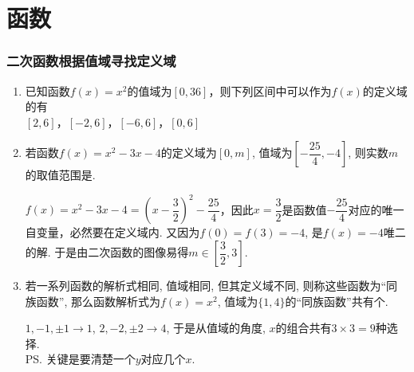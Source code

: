 \chapter*{函数}
\subsection*{二次函数根据值域寻找定义域}
\begin{enumerate}
    \item 已知函数$f(x) = x^2$的值域为$[0, 36]$，则下列区间中可以作为$f(x)$的定义域的有 \\
    $[2, 6]$，$[-2, 6]$，$[-6, 6]$，$[0, 6]$
    \item 若函数$f(x)=x^2-3x-4$的定义域为$[0,m]$, 值域为$\left[-\dfrac{25}{4},-4\right]$, 则实数$m$的取值范围是. 
    \begin{jieda}
    $f(x)=x^2-3x-4=(x-\dfrac{3}{2})^2-\dfrac{25}{4}$，因此$x = \dfrac{3}{2}$是函数值$-\dfrac{25}{4}$对应的唯一自变量，必然要在定义域内. 又因为$f(0)=f(3)=-4$, 是$f(x)=-4$唯二的解. 于是由二次函数的图像易得$m\in\left[\dfrac{3}{2},3\right]$. 
    \end{jieda}
    \item 若一系列函数的解析式相同, 值域相同, 但其定义域不同, 则称这些函数为``同族函数'', 
    那么函数解析式为$f(x)=x^2$, 值域为$\{1,4\}$的``同族函数''共有个.
    \begin{jieda}
    $1,-1,\pm1\to 1$, $2,-2,\pm2\to 4$, 于是从值域的角度, $x$的组合共有$3\times3=9$种选择. \\
    \ps 关键是要清楚一个$y$对应几个$x$.
    \end{jieda} 
\end{enumerate}

